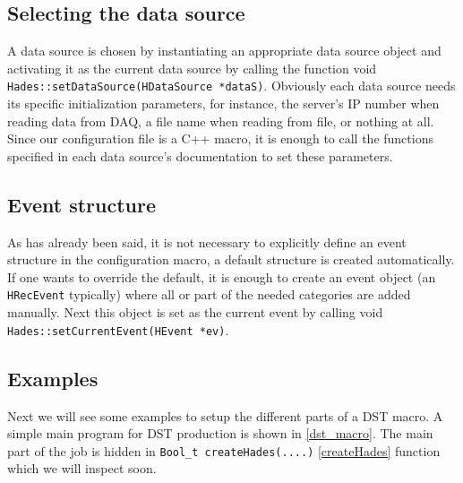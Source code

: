 \subsection{Selecting the data source}

A data source is chosen by instantiating an appropriate data source object and 
activating it as the current data source by calling the function void 
\verb+Hades::setDataSource(HDataSource *dataS)+.
Obviously each data source needs its specific initialization parameters, for 
instance, the server's IP number when reading data from DAQ, a file name when 
reading from file, or nothing at all. Since our configuration file is a C++ macro, 
it is enough to call the functions specified in each data source's documentation 
to set these parameters.

\subsection{Event structure}

As has already been said, it is not necessary to explicitly define an event structure 
in the configuration macro, a default structure is created automatically. If one wants 
to override the default, it is enough to create an event object (an \verb+HRecEvent+ 
typically) where all or part of the needed categories are added manually. Next this 
object is set as the current event by calling void 
\newline
\verb+Hades::setCurrentEvent(HEvent *ev)+.

\subsection{Examples}

Next we will see some examples to setup the different parts of a DST macro. 
A simple main program for DST production is shown in \ref{dst_macro}.
The main part of the job is hidden in \verb+Bool_t createHades(....)+ \ref{createHades}
function which we will inspect soon.

